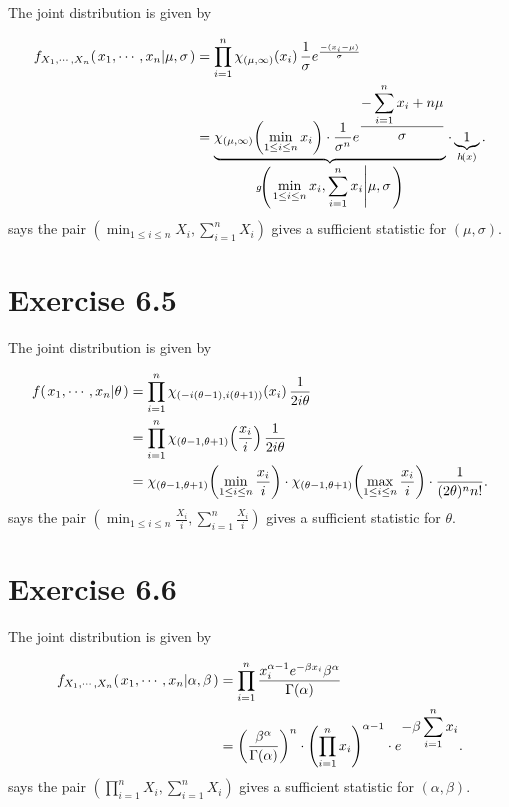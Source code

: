 \documentclass[12pt,letterpaper,reqno]{amsart}
\numberwithin{equation}{subsection}
\begin{document}
The joint distribution is given by

\begin{align*}
    {f_{X_1, \cdots, X_n}}\! \left( {\left. {x_1, \cdots, x_n} \middle| {\mu, \sigma} \right.} \right) &= \prod_{i=1}^n {\chi_{\left( \mu, \infty \right)}}\! \left( {x_i} \right) \frac{1}{\sigma} e^{\frac{-(x_i - \mu)}{\sigma}} \\
    &= \underbrace{{\chi_{\left( \mu, \infty \right)}}\! \left( {\min_{1 \leq i \leq n} x_i} \right) \cdot \frac{1}{\sigma^n} e^{\displaystyle \frac{\displaystyle -\sum_{i=1}^n x_i + n \mu}{\sigma}}}_{{g}\! \left( {\displaystyle \left. {\min_{1 \leq i \leq n} x_i, \sum_{i=1}^n x_i} \middle| {\mu, \sigma} \right.} \right)} \cdot \underbrace{1}_{{h}\! \left( {x} \right)}.
\end{align*}
\cite[Factorization Theorem 6.2.6 on page 276]{Berger-Casella} says the pair $\left(\min_{1 \leq i \leq n} X_i, \sum_{i=1}^n X_i \right)$ gives a sufficient statistic for $(\mu, \sigma)$.

\newpage
\section{Exercise 6.5}

The joint distribution is given by

\begin{align*}
    {f}\! \left( {\left. {x_1, \cdots, x_n} \middle| {\theta} \right.} \right) &= \prod_{i=1}^n {\chi_{\left( -i (\theta - 1), i (\theta + 1) \right)}}\! \left( {x_i} \right) \frac{1}{2i\theta} \\
    &= \prod_{i=1}^n {\chi_{\left( \theta - 1, \theta + 1 \right)}}\! \left( {\frac{x_i}{i}} \right) \frac{1}{2i\theta} \\
    &= {\chi_{(\theta - 1, \theta + 1)}}\! \left( {\min_{1 \leq i \leq n} \frac{x_i}{i}} \right) \cdot {\chi_{(\theta - 1, \theta + 1)}}\! \left( {\max_{1 \leq i \leq n} \frac{x_i}{i}} \right) \cdot \frac{1}{(2\theta)^n n!}.
\end{align*}
\cite[Factorization Theorem 6.2.6 on page 276]{Berger-Casella} says the pair $\left(\min_{1 \leq i \leq n} \frac{X_i}{i}, \sum_{i=1}^n \frac{X_i}{i} \right)$ gives a sufficient statistic for $\theta$.

\newpage
\section{Exercise 6.6}
The joint distribution is given by

\begin{align*}
    {f_{X_1, \cdots, X_n}}\! \left( {\left. {x_1, \cdots, x_n} \middle| {\alpha, \beta} \right.} \right) &= \prod_{i=1}^n \frac{x_i^{\alpha - 1} e^{-\beta x_i} \beta^{\alpha}}{{\Gamma}\! \left( {\alpha} \right)} \\
    &= \left( \frac{\beta^{\alpha}}{{\Gamma}\! \left( {\alpha} \right)} \right)^n \cdot \left( \prod_{i=1}^n x_i \right)^{\alpha - 1} \cdot e^{\displaystyle - \beta \sum_{i=1}^n x_i}.
\end{align*}
\cite[Factorization Theorem 6.2.6 on page 276]{Berger-Casella} says the pair $\left(\prod_{i=1}^n X_i, \sum_{i=1}^n X_i \right)$ gives a sufficient statistic for $(\alpha, \beta)$.
\end{document}
